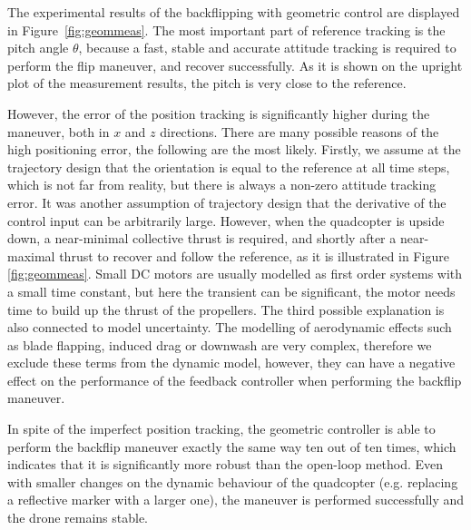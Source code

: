 The experimental results of the backflipping with geometric control are displayed in Figure~\ref{fig:geommeas}. The most important part of reference tracking is the pitch angle $\theta$, because a fast, stable and accurate attitude tracking is required to perform the flip maneuver, and recover successfully. As it is shown on the upright plot of the measurement results, the pitch is very close to the reference. 

However, the error of the position tracking is significantly higher during the maneuver, both in $x$ and $z$ directions. There are many possible reasons of the high positioning error, the following are the most likely. Firstly, we assume at the trajectory design that the orientation is equal to the reference at all time steps, which is not far from reality, but there is always a non-zero attitude tracking error. It was another assumption of trajectory design that the derivative of the control input can be arbitrarily large. However, when the quadcopter is upside down, a near-minimal collective thrust is required, and shortly after a near-maximal thrust to recover and follow the reference, as it is illustrated in Figure \ref{fig:geommeas}. Small DC motors are usually modelled as first order systems with a small time constant, but here the transient can be significant, the motor needs time to build up the thrust of the propellers. The third possible explanation is also connected to model uncertainty. The modelling of aerodynamic effects such as blade flapping, induced drag or downwash \cite{quad_model} are very complex, therefore we exclude these terms from the dynamic model, however, they can have a negative effect on the performance of the feedback controller when performing the backflip maneuver.

In spite of the imperfect position tracking, the geometric controller is able to perform the backflip maneuver exactly the same way ten out of ten times, which indicates that it is significantly more robust than the open-loop method. Even with smaller changes on the dynamic behaviour of the quadcopter (e.g. replacing a reflective marker with a larger one), the maneuver is performed successfully and the drone remains stable.




